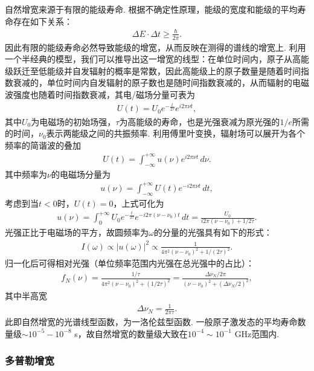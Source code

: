 \documentclass[UTF8,a4paper,10pt]{article}
\providecommand{\abs}[1]{\left\lvert#1\right\rvert}
\begin{document}
自然增宽来源于有限的能级寿命. 根据不确定性原理，能级的宽度和能级的平均寿命存在如下关系：
\begin{align}
    \Delta E\cdot\Delta t\geq\frac{\hbar}{2\pi}.
\end{align}
因此有限的能级寿命必然导致能级的增宽，从而反映在测得的谱线的增宽上. 利用一个半经典的模型，我们可以推导出这一增宽的线型：在单位时间内，原子从高能级跃迁至低能级并自发辐射的概率是常数，因此高能级上的原子数量是随着时间指数衰减的，单位时间内自发辐射的原子数也是随时间指数衰减的，从而辐射的电磁波强度也随着时间指数衰减，其电/磁场分量可表为
\begin{align}
    U(t)=U_0e^{-\frac{t}{2\tau}}e^{i2\pi\nu t},
\end{align}
其中$U_0$为电磁场的初始场强，$\tau$为高能级的寿命，也是光强衰减为原光强的$1/e$所需的时间，$\nu_0$表示两能级之间的共振频率.
利用傅里叶变换，辐射场可以展开为各个频率的简谐波的叠加
\begin{align}
    U(t)=\int_{-\infty}^{+\infty}u(\nu)e^{i2\pi\nu t}\,d\nu.
\end{align}
其中频率为$\nu$的电磁场分量为
\begin{align}
    u(\nu)=\int_{-\infty}^{+\infty}U(t)e^{-i2\pi\nu t}\,dt,
\end{align}
考虑到当$t<0$时，$U(t)=0$，上式可化为
\begin{align}
    u(\nu)=\int_0^{+\infty}U_0e^{-\frac{t}{2\tau}}e^{-i2\pi(\nu-\nu_0)t}\,dt=\frac{U_0}{i2\pi(\nu-\nu_0)+1/2\tau}.
\end{align}
光强正比于电磁场的平方，故圆频率为$\omega$的分量的光强具有如下的形式：
\begin{align}
    I(\omega)\propto\abs{u(\omega)}^2\propto\frac{1}{4\pi^2(\nu-\nu_0)^2+1/(2\tau)^2}.
\end{align}
归一化后可得相对光强（单位频率范围内光强在总光强中的占比）：
\begin{align}
    f_N(\nu)=\frac{1/\tau}{4\pi^2(\nu-\nu_0)^2+(1/2\tau)^2}=\frac{\Delta\nu_N/2\pi}{(\nu-\nu_0)^2+(\Delta\nu_N/2)^2},
\end{align}
其中半高宽\
\begin{align}
    \label{nature-width}
    \Delta\nu_N=\frac{1}{2\pi\tau}.
\end{align}
此即自然增宽的光谱线型函数，为一洛伦兹型函数. 一般原子激发态的平均寿命数量级$\sim 10^{-5}-10^{-8}$ s，故自然增宽的数量级大致在$10^{-4}\sim 10^{-1}$ GHz范围内.

\subsubsection{多普勒增宽}
\end{document}

